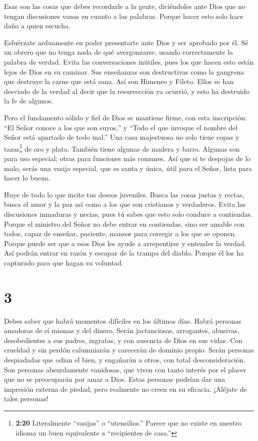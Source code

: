  Esas son las cosas que debes recordarle a la gente,
diciéndoles ante Dios que no tengan discusiones vanas en cuanto a las
palabras. Porque hacer esto solo hace daño a quien escucha.

 Esfuérzate arduamente en poder presentarte ante Dios y ser
aprobado por él. Sé un obrero que no tenga nada de qué avergonzarse,
usando correctamente la palabra de verdad.  Evita las
conversaciones inútiles, pues los que hacen esto están lejos de Dios en
su caminar.  Sus enseñanzas son destructivas como la
gangrena que destruye la carne que está sana. Así son Himeneo y Fileto.
 Ellos se han desviado de la verdad al decir que la
resurrección ya ocurrió, y esto ha destruido la fe de algunos.

 Pero el fundamento sólido y fiel de Dios se mantiene
firme, con esta inscripción: ``El Señor conoce a los que son suyos,'' y
``Todo el que invoque el nombre del Señor está apartado de todo mal.''
 Una casa majestuosa no solo tiene copas y tazas\footnote{\textbf{2:20}
  Literalmente ``vasijas'' o ``utensilios.'' Parece que no existe en
  nuestro idioma un buen equivalente a ``recipientes de casa.''} de oro
y plata. También tiene algunas de madera y barro. Algunas son para uso
especial; otras para funciones más comunes.  Así que si te
despojas de lo malo, serás una vasija especial, que es santa y única,
útil para el Señor, lista para hacer lo bueno.

 Huye de todo lo que incite tus deseos juveniles. Busca las
cosas justas y rectas, busca el amor y la paz así como a los que son
cristianos y verdaderos.  Evita las discusiones inmaduras y
necias, pues tú sabes que esto solo conduce a contiendas. 
Porque el ministro del Señor no debe entrar en contiendas, sino ser
amable con todos, capaz de enseñar, paciente,  mansos para
corregir a los que se oponen. Porque puede ser que a esos Dios les ayude
a arrepentirse y entender la verdad.  Así podrán entrar en
razón y escapar de la trampa del diablo. Porque él los ha capturado para
que hagan su voluntad.

\hypertarget{section-2}{%
\section{3}\label{section-2}}

 Debes saber que habrá momentos difíciles en los últimos
días.  Habrá personas amadoras de sí mismas y del dinero.
Serán jactanciosas, arrogantes, abusivas, desobedientes a sus padres,
ingratas, y con ausencia de Dios en sus vidas.  Con crueldad
y sin perdón calumniarán y carecerán de dominio propio. Serán personas
despiadadas que odian el bien,  y engañarán a otros, con
total desconsideración. Son personas absurdamente vanidosas, que viven
con tanto interés por el placer que no se preocuparán por amar a Dios.
 Estas personas podrían dar una impresión externa de piedad,
pero realmente no creen en su eficacia. ¡Aléjate de tales personas!

